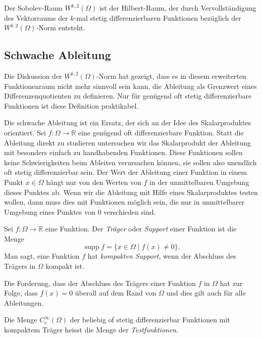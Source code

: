 \begin{definition}
Der Sobolev-Raum $W^{k,2}(\Omega)$ ist der Hilbert-Raum, der durch
Vervollständigung des Vektorraums der $k$-mal stetig differenzierbaren
Funktionen bezüglich der $W^{k,2}(\Omega)$-Norm entsteht.
\end{definition}

%
%
\subsection{Schwache Ableitung}
Die Diskussion der $W^{k,2}(\Omega)$-Norm hat gezeigt, dass es in diesem
erweiterten Funktionenraum nicht mehr sinnvoll sein kann, die Ableitung
als Grenzwert eines Differenzenquotienten zu definieren.
Nur für genügend oft stetig differenzierbare Funktionen ist diese
Definition praktikabel.

Die schwache Ableitung ist ein Ersatz, der sich an der Idee des
Skalarproduktes orientiert.
Sei $f\colon \Omega\to\mathbb{R}$ eine genügend oft differenzierbare
Funktion.
Statt die Ableitung direkt zu studieren untersuchen wir das Skalarprodukt
der Ableitung mit besonders einfach zu handhabenden Funktionen.
Diese Funktionen sollen keine Schwierigkeiten beim Ableiten
verursachen können, sie sollen also unendlich oft stetig differenzierbar
sein.
Der Wert der Ableitung einer Funktion in einem Punkt $x\in\Omega$ hängt nur 
von den Werten von $f$ in der unmittelbaren Umgebung dieses Punktes ab.
Wenn wir die Ableitung mit Hilfe eines Skalarproduktes testen wollen,
dann muss dies mit Funktionen möglich sein, die nur in unmittelbarer
Umgebung eines Punktes von $0$ verschieden sind.

\begin{definition}
Sei $f\colon\Omega\to\mathbb{R}$ eine Funktion.
Der {\em Träger} oder {\em Support} einer Funktion ist die
Menge
\[
\operatorname{supp} f = \{x\in\Omega\mid f(x)\ne 0\}.
\]
Man sagt, eine Funktion $f$ hat {\em kompakten Support}, wenn 
der Abschluss des Trägers in $\Omega$ kompakt ist.
\end{definition}

Die Forderung, dass der Abschluss des Trägers einer Funktion $f$
in $\Omega$ hat zur Folge, dass $f(x)=0$ überall auf dem Rand
von $\Omega$ und dies gilt auch für alle Ableitungen.

\begin{definition}
Die Menge $C_c^{\infty}(\Omega)$ der beliebig of stetig differenzierbar
Funktionen mit kompaktem Träger heisst die Menge der {\em Testfunktionen}.
\end{definition}

